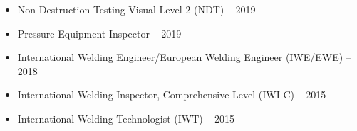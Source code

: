 \documentclass[11pt]{article}
\newlength{\SidebarPadL}
\newlength{\SidebarPadR}
\begin{document}
\begin{paracol}{2}
\begin{adjustwidth}{\SidebarPadL}{\SidebarPadR}
\begin{itemize}
\item Non-Destruction Testing Visual Level 2 (NDT) -- 2019
\item Pressure Equipment Inspector -- 2019
\item International Welding Engineer/European Welding Engineer (IWE/EWE) -- 2018
\item International Welding Inspector, Comprehensive Level (IWI-C) -- 2015
\item International Welding Technologist (IWT) -- 2015  
\end{itemize}  
\end{adjustwidth} 
\end{paracol}  
\end{document}
